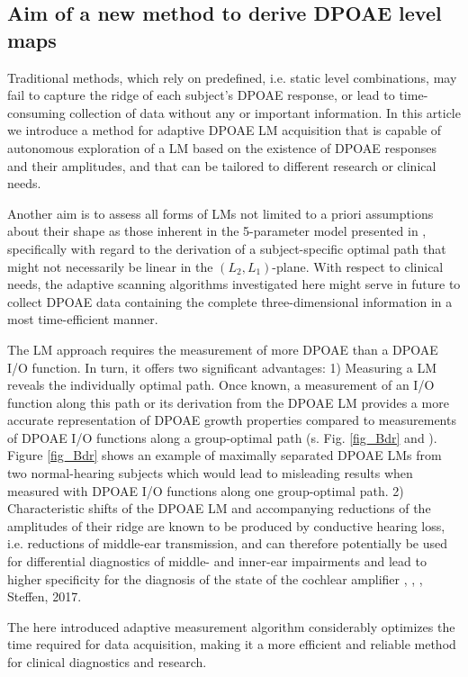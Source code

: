 \documentclass[journal,twoside,web]{ieeecolor2}
\begin{document}
\subsection{Aim of a new method to derive DPOAE level maps}
Traditional methods, which rely on predefined, i.e. static level combinations, may fail to capture the ridge of each subject’s DPOAE response, or lead to time-consuming collection of data without any or important information.
In this article we introduce a method for adaptive DPOAE LM acquisition that is capable of autonomous exploration of a LM based on the existence of DPOAE responses and their amplitudes, and that can be tailored to different research or clinical needs.

Another aim is to assess all forms of LMs not limited to a priori assumptions about their shape as those inherent in the 5-parameter model presented in \cite{ZD2020}, specifically with regard to the derivation of a subject-specific optimal path that might not necessarily be linear in the $(L_2, L_1)$-plane.
With respect to clinical needs, the adaptive scanning algorithms investigated here might serve in future to collect DPOAE data containing the complete three-dimensional information in a most time-efficient manner.

The LM approach requires the measurement of more DPOAE than a DPOAE I/O function.
In turn, it offers two significant advantages: 1) Measuring a LM reveals the individually optimal path.
Once known, a measurement of an I/O function along this path or its derivation from the DPOAE LM provides a more accurate representation of DPOAE growth properties compared to measurements of DPOAE I/O functions along a group-optimal path (s. Fig. \ref{fig_Bdr} and \cite{ZD2020}).
Figure \ref{fig_Bdr} shows an example of maximally separated DPOAE LMs from two normal-hearing subjects which would lead to misleading results when measured with DPOAE I/O functions along one group-optimal path.
2) Characteristic shifts of the DPOAE LM and accompanying reductions of the amplitudes of their ridge are known to be produced by conductive hearing loss, i.e.
reductions of middle-ear transmission, and can therefore potentially be used for differential diagnostics of middle- and inner-ear impairments and lead to higher specificity for the diagnosis of the state of the cochlear amplifier \cite{Js2005}, \cite{Km2006}, \cite{Tu2009}, Steffen, 2017.

The here introduced adaptive measurement algorithm considerably optimizes the time required for data acquisition, making it a more efficient and reliable method for clinical diagnostics and research.
\end{document}
